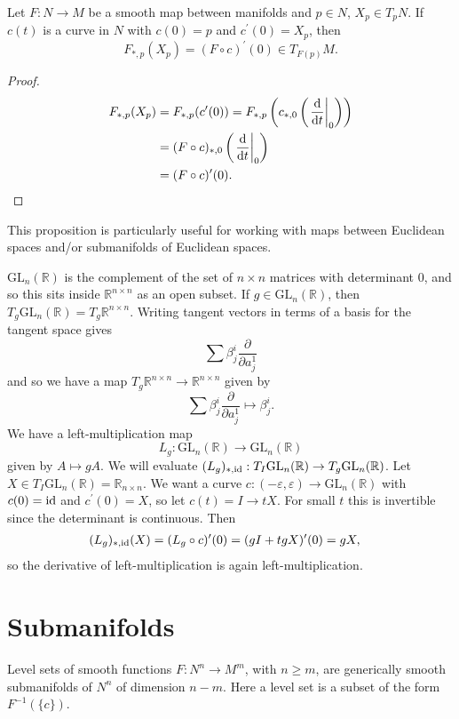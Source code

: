 \begin{prop}
Let $F: N \to M$ be a smooth map between manifolds and
$p \in N$, $X_p \in T_p N$. If $c(t)$ is a curve in $N$ with
$c(0) = p$ and $c^\prime(0) = X_p$, then
$$
  F_{\ast, p}(X_p)
= (F \circ c)^\prime(0) \in T_{F(p)} M.
$$
\end{prop}
\begin{proof}
\begin{align*}
   F_{\ast, p}(X_p)
&= F_{\ast, p}(c^\prime(0))
 = F_{\ast, p}
     \left(
       c_{\ast,0}
       \left(
         \left.\frac{\mathop{}\!\mathrm{d}}{\mathop{}\!\mathrm{d} t}\right|_0
       \right)
     \right) \\
&= (F \circ c)_{\ast, 0}
     \left(
       \left.\frac{\mathop{}\!\mathrm{d}}{\mathop{}\!\mathrm{d} t}\right|_0
     \right) \\
&= (F \circ c)^\prime(0).
\end{align*}
\end{proof}

\begin{remark}
This proposition is particularly useful for working with maps between
Euclidean spaces and/or submanifolds of Euclidean spaces.
\end{remark}

\begin{xmpl}
$\mathrm{GL}_n(\mathbb{R})$ is the complement of the set of $n \times
n$ matrices with determinant 0, and so this sits inside $\mathbb{R}^{n
  \times n}$ as an open subset. If $g \in \mathrm{GL}_n(\mathbb{R})$,
then $T_g \mathrm{GL}_n(\mathbb{R}) = T_g \mathbb{R}^{n \times n}$.
Writing tangent vectors in terms of a basis for the tangent space gives
$$
\sum
  \beta^i_j \frac{\partial}{\partial a^1_j}
$$
and so we have a map
$T_g \mathbb{R}^{n \times n} \to \mathbb{R}^{n \times n}$ given by
$$
\sum
  \beta^i_j \frac{\partial}{\partial a^1_j}
\mapsto
  \beta^i_j.
$$
We have a left-multiplication map
$$
L_g: \mathrm{GL}_n(\mathbb{R}) \to \mathrm{GL}_n(\mathbb{R})
$$
given by $A \mapsto gA$. We will evaluate
$(L_g)_{\ast, \mathrm{id}} : T_I \mathrm{GL}_n(\mathbb{R}) \to T_g \mathrm{GL}_n(\mathbb{R})$.
Let $X \in T_I \mathrm{GL}_n(\mathbb{R}) = \mathbb{R}_{n \times
  n}$. We want a curve
$c: (-\varepsilon, \varepsilon) \to \mathrm{GL}_n(\mathbb{R})$ with
$c(0) = \mathrm{id}$ and $c^\prime(0) = X$, so let $c(t) = I \to t X$. For
small $t$ this is invertible since the determinant is continuous. Then
\begin{align*}
   (L_g)_{\ast, \mathrm{id}}(X)
&= (L_g \circ c)^\prime(0)
 = (gI + tgX)^\prime(0)
 = gX,
\end{align*}
so the derivative of left-multiplication is again left-multiplication.
\end{xmpl}

\section{Submanifolds}
Level sets of smooth functions $F: N^n \to M^m$, with $n \geq m$, are
generically smooth submanifolds of $N^n$ of dimension $n - m$. Here a
level set is a subset of the form $F^{-1}(\{c\})$.
